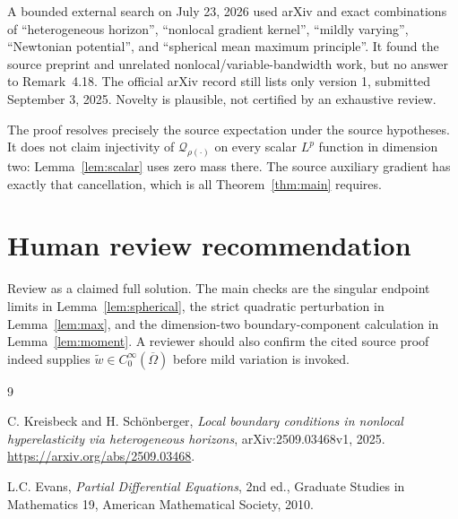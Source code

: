 \documentclass[11pt]{article}
\newcommand{\Qhet}{\mathcal Q_{\rho(\cdot)}}
\begin{document}
A bounded external search on July 23, 2026 used arXiv and exact combinations
of ``heterogeneous horizon'', ``nonlocal gradient kernel'', ``mildly
varying'', ``Newtonian potential'', and ``spherical mean maximum principle''.
It found the source preprint and unrelated nonlocal/variable-bandwidth work,
but no answer to Remark~4.18. The official arXiv record still lists only
version 1, submitted September 3, 2025. Novelty is plausible, not certified
by an exhaustive review.

The proof resolves precisely the source expectation under the source
hypotheses. It does not claim injectivity of \(\Qhet\) on every scalar
\(L^p\) function in dimension two: Lemma~\ref{lem:scalar} uses zero mass
there. The source auxiliary gradient has exactly that cancellation, which is
all Theorem~\ref{thm:main} requires.

\section*{Human review recommendation}

Review as a claimed full solution. The main checks are the singular endpoint
limits in Lemma~\ref{lem:spherical}, the strict quadratic perturbation in
Lemma~\ref{lem:max}, and the dimension-two boundary-component calculation in
Lemma~\ref{lem:moment}. A reviewer should also confirm the cited source proof
indeed supplies \(\widetilde w\in C_0^\infty(\overline\Omega)\) before mild
variation is invoked.

\begin{thebibliography}{9}

C. Kreisbeck and H. Schönberger,
\emph{Local boundary conditions in nonlocal hyperelasticity via heterogeneous
horizons},
arXiv:2509.03468v1, 2025.
\url{https://arxiv.org/abs/2509.03468}.

L.C. Evans,
\emph{Partial Differential Equations},
2nd ed., Graduate Studies in Mathematics 19,
American Mathematical Society, 2010.

\end{thebibliography}
\end{document}
